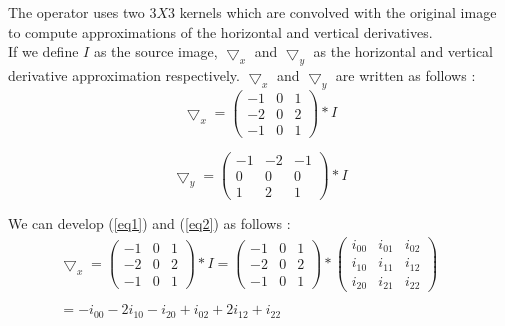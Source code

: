 \documentclass[12pt,a4paper]{article}
\begin{document}
The operator uses two $3X3$ kernels which are convolved with the original image to compute approximations of the horizontal and vertical derivatives. \\

If we define $I$ as the source image, $\bigtriangledown_x$ and $\bigtriangledown_y$ as the horizontal and vertical derivative approximation respectively. $\bigtriangledown_x$ and $\bigtriangledown_y$ are written as follows :\\

\begin{equation}\label{eq1}
\bigtriangledown_x = \begin{pmatrix}
-1 & 0 & 1 \\ 
-2 & 0 & 2 \\ 
-1 & 0 & 1
\end{pmatrix}*I
\end{equation}

\vspace{0.5cm}

\begin{equation}\label{eq2}
\bigtriangledown_y = \begin{pmatrix}
-1 & -2 & -1 \\ 
0 & 0 & 0 \\ 
1 & 2 & 1
\end{pmatrix}*I
\end{equation}

\vspace{0.5cm}

We can develop (\ref{eq1}) and (\ref{eq2}) as follows :\\

\begin{equation}\label{eq3}
\begin{matrix}
\bigtriangledown_x = \begin{pmatrix}
-1 & 0 & 1 \\ 
-2 & 0 & 2 \\ 
-1 & 0 & 1
\end{pmatrix}*I  = \begin{pmatrix}
-1 & 0 & 1 \\ 
-2 & 0 & 2 \\ 
-1 & 0 & 1
\end{pmatrix}* \begin{pmatrix}
i_{00} & i_{01} & i_{02} \\ 
i_{10} & i_{11} & i_{12}\\ 
i_{20} & i_{21} & i_{22}
\end{pmatrix}  \\ 
& & \\
 =  -i_{00}-2i_{10}-i_{20}+i_{02}+2i_{12}+i_{22} \\ 
\end{matrix}
\end{equation}
\end{document}

